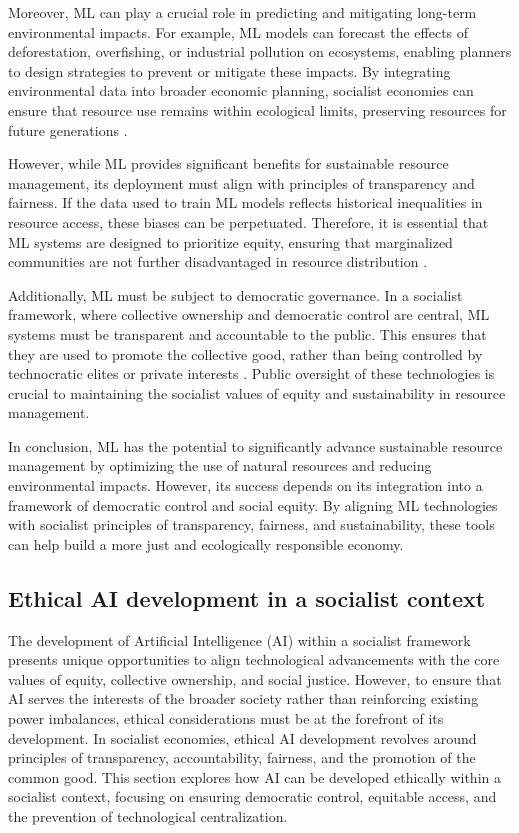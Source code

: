 \begin{refsection}
Moreover, ML can play a crucial role in predicting and mitigating long-term environmental impacts. For example, ML models can forecast the effects of deforestation, overfishing, or industrial pollution on ecosystems, enabling planners to design strategies to prevent or mitigate these impacts. By integrating environmental data into broader economic planning, socialist economies can ensure that resource use remains within ecological limits, preserving resources for future generations \cite[pp.~67-70]{scholz2013}.

However, while ML provides significant benefits for sustainable resource management, its deployment must align with principles of transparency and fairness. If the data used to train ML models reflects historical inequalities in resource access, these biases can be perpetuated. Therefore, it is essential that ML systems are designed to prioritize equity, ensuring that marginalized communities are not further disadvantaged in resource distribution \cite[pp.~89-92]{treccani2021}. 

Additionally, ML must be subject to democratic governance. In a socialist framework, where collective ownership and democratic control are central, ML systems must be transparent and accountable to the public. This ensures that they are used to promote the collective good, rather than being controlled by technocratic elites or private interests \cite[pp.~112-115]{tapscott2016}. Public oversight of these technologies is crucial to maintaining the socialist values of equity and sustainability in resource management.

In conclusion, ML has the potential to significantly advance sustainable resource management by optimizing the use of natural resources and reducing environmental impacts. However, its success depends on its integration into a framework of democratic control and social equity. By aligning ML technologies with socialist principles of transparency, fairness, and sustainability, these tools can help build a more just and ecologically responsible economy.

\subsection{Ethical AI development in a socialist context}

The development of Artificial Intelligence (AI) within a socialist framework presents unique opportunities to align technological advancements with the core values of equity, collective ownership, and social justice. However, to ensure that AI serves the interests of the broader society rather than reinforcing existing power imbalances, ethical considerations must be at the forefront of its development. In socialist economies, ethical AI development revolves around principles of transparency, accountability, fairness, and the promotion of the common good. This section explores how AI can be developed ethically within a socialist context, focusing on ensuring democratic control, equitable access, and the prevention of technological centralization.


\end{refsection}

